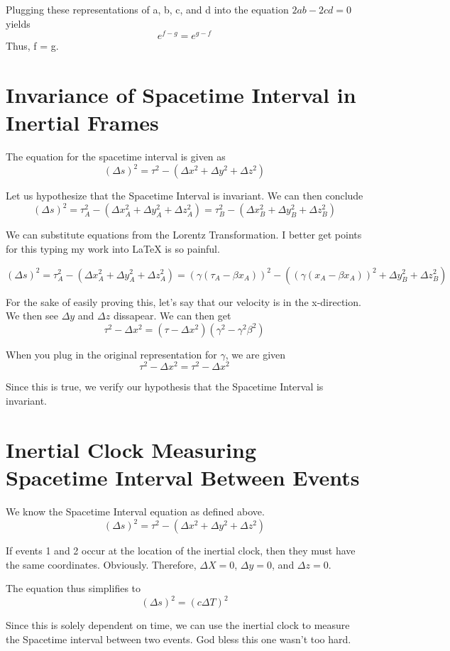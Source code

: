 \documentclass{article}
\begin{document}
Plugging these representations of a, b, c, and d into the equation \(2ab - 2cd = 0\) yields
\[
  e^{f - g} = e^{g - f}
\]
Thus, f = g.

\newpage
\section{Invariance of Spacetime Interval in Inertial Frames}
The equation for the spacetime interval is given as
\[
  (\Delta s)^2 = \tau^2 - (\Delta x^2 + \Delta y^2 + \Delta z^2)
\]

Let us hypothesize that the Spacetime Interval is invariant. We can then conclude
\[
  (\Delta s)^2 = \tau_A^2 - (\Delta x_A^2 + \Delta y_A^2 + \Delta z_A^2) = \tau_B^2 - (\Delta x_B^2 + \Delta y_B^2 + \Delta z_B^2)
\]

We can substitute equations from the Lorentz Transformation. I better get points for this typing my work into LaTeX is so painful.

\[
  (\Delta s)^2 = \tau_A^2 - (\Delta x_A^2 + \Delta y_A^2 + \Delta z_A^2) = (\gamma (\tau_A - \beta x_A))^2 - ((\gamma (x_A - \beta x_A))^2 + \Delta y_B^2 + \Delta z_B^2)
\]

For the sake of easily proving this, let's say that our velocity is in the x-direction. We then see \(\Delta y\) and \(\Delta z\) dissapear. We can then get
\[
  \tau^2 - \Delta x^2 = (\tau - \Delta x^2)(\gamma^2 - \gamma^2 \beta^2)
\]

When you plug in the original representation for \(\gamma\), we are given
\[
  \tau^2 - \Delta x^2 = \tau^2 - \Delta x^2
\]

Since this is true, we verify our hypothesis that the Spacetime Interval is invariant.

\newpage
\section{Inertial Clock Measuring Spacetime Interval Between Events}
We know the Spacetime Interval equation as defined above.
\[
  (\Delta s)^2 = \tau^2 - (\Delta x^2 + \Delta y^2 + \Delta z^2)
\]

If events 1 and 2 occur at the location of the inertial clock, then they must have the same coordinates. Obviously. Therefore, \(\Delta X = 0\), \(\Delta y = 0\), and \(\Delta z = 0\).

The equation thus simplifies to
\[
  (\Delta s)^2 = (c\Delta T)^2
\]

Since this is solely dependent on time, we can use the inertial clock to measure the Spacetime interval between two events. God bless this one wasn't too hard.
\newpage
\end{document}
